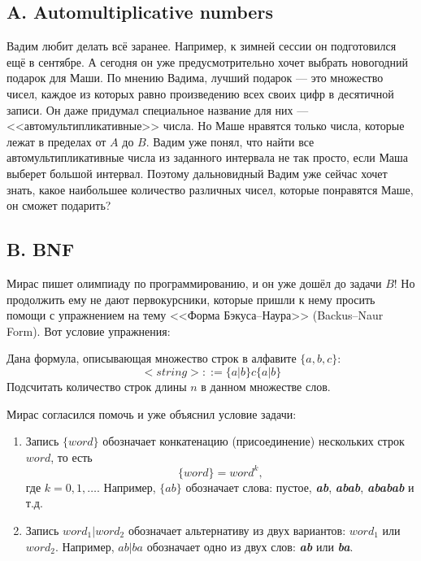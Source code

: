 \subsection*{A. Automultiplicative numbers}

Вадим любит делать всё заранее. Например, к зимней сессии он подготовился ещё в сентябре. А сегодня он уже предусмотрительно хочет выбрать новогодний подарок для Маши. По мнению Вадима, лучший подарок --- это множество чисел, каждое из которых равно произведению всех своих цифр в десятичной записи. Он даже придумал специальное название для них --- <<автомультипликативные>> числа. Но Маше нравятся только числа, которые лежат в пределах от $A$ до $B$. Вадим уже понял, что найти все автомультипликативные числа из заданного интервала не так просто, если Маша выберет большой интервал. Поэтому дальновидный Вадим уже сейчас хочет знать, какое наибольшее количество различных чисел, которые понравятся Маше, он сможет подарить?







\subsection*{B. BNF}

Мирас пишет олимпиаду по программированию, и он уже дошёл до задачи $B$! Но продолжить ему не дают первокурсники, которые пришли к нему просить помощи с упражнением на тему <<Форма Бэкуса--Наура>> (Backus--Naur Form). Вот условие упражнения:

Дана формула, описывающая множество строк в алфавите $\{a, b, c\}$:
$$<string> ::= \{a | b\} c \{a | b\}$$
Подсчитать количество строк длины $n$ в данном множестве слов.

Мирас согласился помочь и уже объяснил условие задачи:
\begin{enumerate}
\item Запись $\{word\}$ обозначает конкатенацию (присоединение) нескольких строк $word$, то есть 
$$\{word\} = word^k,$$
где \mbox{$k = 0, 1, \dots$}. Например, $\{ab\}$ обозначает слова: пустое, \textit{\textbf{ab}}, \textit{\textbf{abab}}, \textit{\textbf{ababab}} и т.д.

\item Запись $word_1 | word_2$ обозначает альтернативу из двух вариантов: $word_1$ или $word_2$.
Например, $ab | ba$ обозначает одно из двух слов: \textit{\textbf{ab}} или \textit{\textbf{ba}}.
\end{enumerate}

